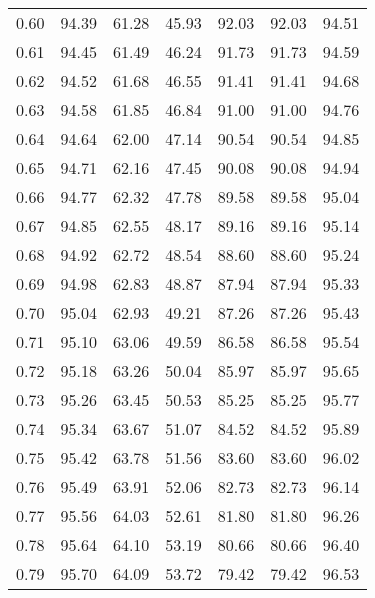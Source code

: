 \begin{tabular}{|c|c|c|c|c|c|c|}
      0.60 &     94.39 &     61.28 &      45.93 &   92.03 &      92.03 &         94.51 \\
      0.61 &     94.45 &     61.49 &      46.24 &   91.73 &      91.73 &         94.59 \\
      0.62 &     94.52 &     61.68 &      46.55 &   91.41 &      91.41 &         94.68 \\
      0.63 &     94.58 &     61.85 &      46.84 &   91.00 &      91.00 &         94.76 \\
      0.64 &     94.64 &     62.00 &      47.14 &   90.54 &      90.54 &         94.85 \\
      0.65 &     94.71 &     62.16 &      47.45 &   90.08 &      90.08 &         94.94 \\
      0.66 &     94.77 &     62.32 &      47.78 &   89.58 &      89.58 &         95.04 \\
      0.67 &     94.85 &     62.55 &      48.17 &   89.16 &      89.16 &         95.14 \\
      0.68 &     94.92 &     62.72 &      48.54 &   88.60 &      88.60 &         95.24 \\
      0.69 &     94.98 &     62.83 &      48.87 &   87.94 &      87.94 &         95.33 \\
      0.70 &     95.04 &     62.93 &      49.21 &   87.26 &      87.26 &         95.43 \\
      0.71 &     95.10 &     63.06 &      49.59 &   86.58 &      86.58 &         95.54 \\
      0.72 &     95.18 &     63.26 &      50.04 &   85.97 &      85.97 &         95.65 \\
      0.73 &     95.26 &     63.45 &      50.53 &   85.25 &      85.25 &         95.77 \\
      0.74 &     95.34 &     63.67 &      51.07 &   84.52 &      84.52 &         95.89 \\
      0.75 &     95.42 &     63.78 &      51.56 &   83.60 &      83.60 &         96.02 \\
      0.76 &     95.49 &     63.91 &      52.06 &   82.73 &      82.73 &         96.14 \\
      0.77 &     95.56 &     64.03 &      52.61 &   81.80 &      81.80 &         96.26 \\
      0.78 &     95.64 &     64.10 &      53.19 &   80.66 &      80.66 &         96.40 \\
      0.79 &     95.70 &     64.09 &      53.72 &   79.42 &      79.42 &         96.53 \\

\end{tabular}
